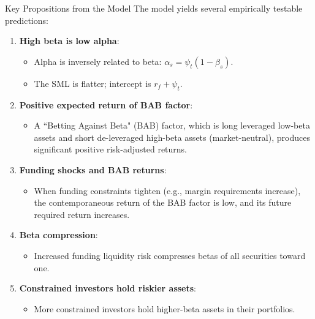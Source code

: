 \documentclass[10pt]{beamer}
\begin{document}
\begin{frame}{Key Propositions from the Model}
  The model yields several empirically testable predictions:
  \begin{enumerate}
    \item \textbf{High beta is low alpha}:
        \begin{itemize}
            \item Alpha is inversely related to beta: $\alpha_s = \psi_t (1-\beta_s)$.
            \item The SML is flatter; intercept is $r_f + \psi_t$.
        \end{itemize}
    \item \textbf{Positive expected return of BAB factor}:
        \begin{itemize}
            \item A ``Betting Against Beta" (BAB) factor, which is long leveraged low-beta assets and short de-leveraged high-beta assets (market-neutral), produces significant positive risk-adjusted returns.
        \end{itemize}
    \item \textbf{Funding shocks and BAB returns}:
        \begin{itemize}
            \item When funding constraints tighten (e.g., margin requirements increase), the contemporaneous return of the BAB factor is low, and its future required return increases.
        \end{itemize}
    \item \textbf{Beta compression}:
        \begin{itemize}
            \item Increased funding liquidity risk compresses betas of all securities toward one.
        \end{itemize}
    \item \textbf{Constrained investors hold riskier assets}:
        \begin{itemize}
            \item More constrained investors hold higher-beta assets in their portfolios.
        \end{itemize}
  \end{enumerate}
\end{frame}
\end{document}

